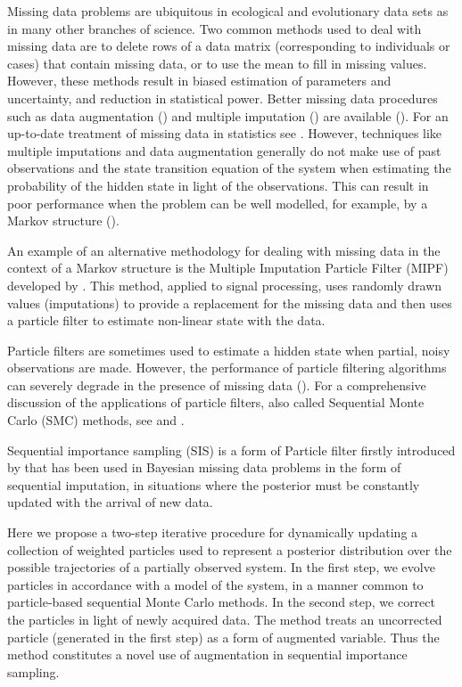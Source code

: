 Missing data problems are ubiquitous in ecological and evolutionary data sets as in many other branches of science. Two common methods used to deal with missing data are to delete rows of a data matrix (corresponding to individuals or cases) that contain missing data, or to use the mean to fill in missing values. However, these methods result in biased estimation of parameters and uncertainty, and reduction in statistical power. Better missing data procedures such as data augmentation (\cite{Tanner}) and multiple imputation (\cite{RubinMI}) are available  (\cite{Nakagawa}).
For an up-to-date treatment of missing data in statistics see \cite{Little}.
However, techniques like multiple imputations and data augmentation generally do not make use of past observations and the state transition equation of the system when estimating the probability of the hidden state in light of the observations. This can result in poor performance when the problem can be well modelled, for example, by a Markov structure (\cite{Zhang}).

An example of an alternative methodology for dealing with missing data in the context of a Markov structure is the Multiple Imputation Particle Filter (MIPF) developed by \cite{Zhang}. This method, applied to signal processing, uses randomly drawn values (imputations) to provide a replacement for the missing data and then uses a particle filter to estimate non-linear state with the data.

Particle filters are sometimes used to estimate a hidden state when partial, noisy observations are made. However, the performance of particle filtering algorithms can severely degrade in the presence of missing data (\cite{Zhang}). For a comprehensive discussion of the applications of particle filters, also called Sequential Monte Carlo (SMC) methods, see \cite{Cappe} and \cite{Doucet}.

Sequential importance sampling (SIS) is a form of Particle filter firstly introduced by \cite{Kong} that has been used in Bayesian missing data problems in the form of sequential imputation, in situations where the posterior must be constantly updated with the arrival of new data.

Here we propose a two-step iterative procedure for dynamically updating a collection of weighted particles used to represent a posterior distribution over the possible trajectories of a partially observed system. In the first step, we evolve particles in accordance with a model of the system, in a manner common to particle-based sequential Monte Carlo methods. In the second step, we correct the particles in light of newly acquired data. The method treats an uncorrected particle (generated in the first step) as a form of augmented variable. Thus the method constitutes a novel use of augmentation in sequential importance sampling. 


